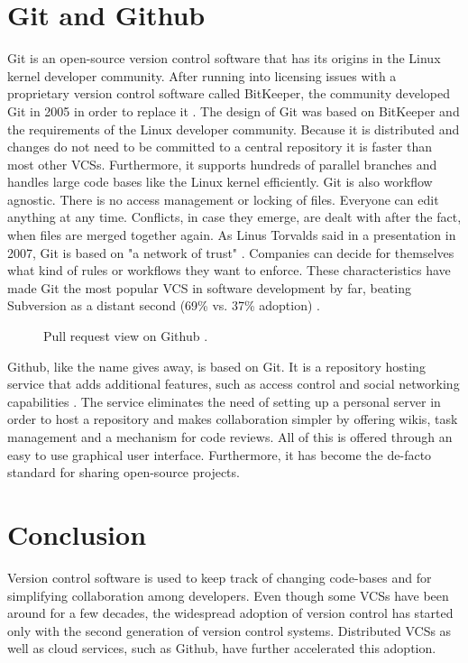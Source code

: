 \section{Git and Github}
Git is an open-source version control software that has its origins in the Linux kernel developer community. After running into licensing issues with a proprietary version control software called BitKeeper, the community developed Git in 2005 in order to replace it \cite{chacon_pro_2009, ruparelia_history_2010}. The design of Git was based on BitKeeper and the requirements of the Linux developer community. Because it is distributed and changes do not need to be committed to a central repository it is faster than most other VCSs. Furthermore, it supports hundreds of parallel branches and handles large code bases like the Linux kernel efficiently. Git is also workflow agnostic. There is no access management or locking of files. Everyone can edit anything at any time. Conflicts, in case they emerge, are dealt with after the fact, when files are merged together again. As Linus Torvalds said in a presentation in 2007, Git is based on "a network of trust" \cite{torvalds_linus_2007}. Companies can decide for themselves what kind of rules or workflows they want to enforce. These characteristics have made Git the most popular VCS in software development by far, beating Subversion as a distant second (69\% vs. 37\% adoption) \cite{_stack_2015}.

\begin{figure}[h!]
 \centering
 \caption{Pull request view on Github \cite{_about_????}.}
 \label{fig:github-pr}
\end{figure}

Github, like the name gives away, is based on Git. It is a repository hosting service that adds additional features, such as access control and social networking capabilities \cite{finley_what_2012}. The service eliminates the need of setting up a personal server in order to host a  repository and makes collaboration simpler by offering wikis, task management and a mechanism for code reviews. All of this is offered through an easy to use graphical user interface. Furthermore, it has become the de-facto standard for sharing open-source projects.

\section{Conclusion}
Version control software is used to keep track of changing code-bases and for simplifying collaboration among developers. Even though some VCSs have been around for a few decades, the widespread adoption of version control has started only with the second generation of version control systems. Distributed VCSs as well as cloud services, such as Github, have further accelerated this adoption.

